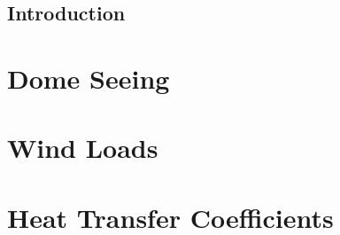 \documentclass{gmto-book}
\begin{document}
\clearpage

\chapter{Introduction}
\label{sec:introduction}



\part{Dome Seeing}
\label{dome-seeing}





\part{Wind Loads}
\label{wind-loads}





\part{Heat Transfer Coefficients}
\label{htc}






\printbibliography
\end{document}
